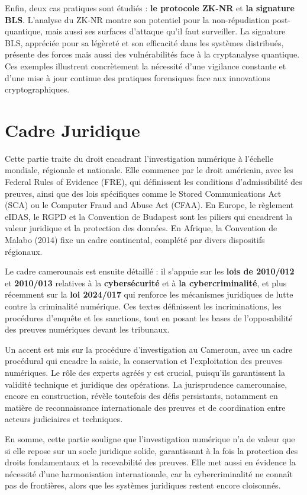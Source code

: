 \documentclass[memoire, 12pt]{report}
\begin{document}
Enfin, deux cas pratiques sont étudiés : \textbf{le protocole ZK-NR} et \textbf{la signature BLS}. L’analyse du ZK-NR montre son potentiel pour la non-répudiation post-quantique, mais aussi ses surfaces d’attaque qu’il faut surveiller. La signature BLS, appréciée pour sa légèreté et son efficacité dans les systèmes distribués, présente des forces mais aussi des vulnérabilités face à la cryptanalyse quantique. Ces exemples illustrent concrètement la nécessité d’une vigilance constante et d’une mise à jour continue des pratiques forensiques face aux innovations cryptographiques.


\section*{Cadre Juridique}
Cette partie traite du droit encadrant l’investigation numérique à l’échelle mondiale, régionale et nationale. Elle commence par le droit américain, avec les Federal Rules of Evidence (FRE), qui définissent les conditions d’admissibilité des preuves, ainsi que des lois spécifiques comme le Stored Communications Act (SCA) ou le Computer Fraud and Abuse Act (CFAA). En Europe, le règlement eIDAS, le RGPD et la Convention de Budapest sont les piliers qui encadrent la valeur juridique et la protection des données. En Afrique, la Convention de Malabo (2014) fixe un cadre continental, complété par divers dispositifs régionaux.

Le cadre camerounais est ensuite détaillé : il s’appuie sur les \textbf{lois de 2010/012} et \textbf{2010/013} relatives à la \textbf{cybersécurité} et à \textbf{la cybercriminalité}, et plus récemment sur la \textbf{loi 2024/017} qui renforce les mécanismes juridiques de lutte contre la criminalité numérique. Ces textes définissent les incriminations, les procédures d’enquête et les sanctions, tout en posant les bases de l’opposabilité des preuves numériques devant les tribunaux.

Un accent est mis sur la procédure d’investigation au Cameroun, avec un cadre procédural qui encadre la saisie, la conservation et l’exploitation des preuves numériques. Le rôle des experts agréés y est crucial, puisqu’ils garantissent la validité technique et juridique des opérations. La jurisprudence camerounaise, encore en construction, révèle toutefois des défis persistants, notamment en matière de reconnaissance internationale des preuves et de coordination entre acteurs judiciaires et techniques.

En somme, cette partie souligne que l’investigation numérique n’a de valeur que si elle repose sur un socle juridique solide, garantissant à la fois la protection des droits fondamentaux et la recevabilité des preuves. Elle met aussi en évidence la nécessité d’une harmonisation internationale, car la cybercriminalité ne connaît pas de frontières, alors que les systèmes juridiques restent encore cloisonnés.
\end{document}
